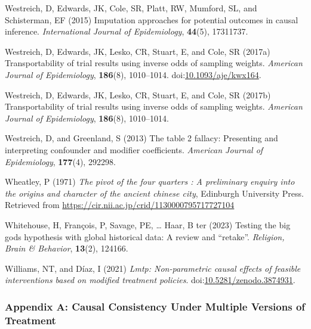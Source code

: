 \documentclass[
  singlecolumn]{article}
\newlength{\cslhangindent}
\newenvironment{CSLReferences}[2] %
 {\begin{list}{}{%
  \setlength{\itemindent}{0pt}
  \setlength{\leftmargin}{0pt}
  \setlength{\parsep}{0pt}
  \ifodd #1
   \setlength{\leftmargin}{\cslhangindent}
   \setlength{\itemindent}{-1\cslhangindent}
  \fi
  \setlength{\itemsep}{#2\baselineskip}}}
 {\end{list}}
\begin{document}
\begin{CSLReferences}{1}{0}
Westreich, D, Edwards, JK, Cole, SR, Platt, RW, Mumford, SL, and
Schisterman, EF (2015) Imputation approaches for potential outcomes in
causal inference. \emph{International Journal of Epidemiology},
\textbf{44}(5), 17311737.

Westreich, D, Edwards, JK, Lesko, CR, Stuart, E, and Cole, SR (2017a)
Transportability of trial results using inverse odds of sampling
weights. \emph{American Journal of Epidemiology}, \textbf{186}(8),
1010--1014.
doi:\href{https://doi.org/10.1093/aje/kwx164}{10.1093/aje/kwx164}.

Westreich, D, Edwards, JK, Lesko, CR, Stuart, E, and Cole, SR (2017b)
Transportability of trial results using inverse odds of sampling
weights. \emph{American Journal of Epidemiology}, \textbf{186}(8),
1010--1014.

Westreich, D, and Greenland, S (2013) The table 2 fallacy: Presenting
and interpreting confounder and modifier coefficients. \emph{American
Journal of Epidemiology}, \textbf{177}(4), 292298.

Wheatley, P (1971) \emph{The pivot of the four quarters : A preliminary
enquiry into the origins and character of the ancient chinese city},
Edinburgh University Press. Retrieved from
\url{https://cir.nii.ac.jp/crid/1130000795717727104}

Whitehouse, H, François, P, Savage, PE, \ldots{} Haar, B ter (2023)
Testing the big gods hypothesis with global historical data: A review
and {``}retake{''}. \emph{Religion, Brain \& Behavior}, \textbf{13}(2),
124166.

Williams, NT, and Díaz, I (2021) \emph{Lmtp: Non-parametric causal
effects of feasible interventions based on modified treatment policies}.
doi:\href{https://doi.org/10.5281/zenodo.3874931}{10.5281/zenodo.3874931}.

\end{CSLReferences}

\newpage{}

\subsubsection{Appendix A: Causal Consistency Under Multiple Versions of
Treatment}\label{appendix-a-causal-consistency-under-multiple-versions-of-treatment}
\end{document}
